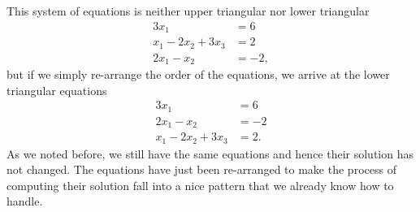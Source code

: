 This system of equations is neither upper triangular nor lower triangular
\begin{equation}
\label{eq:BeforeSwapping}
    \begin{aligned}
     3 x_1 &=6 \\
    x_1 - 2 x_2 + 3 x_3  &= 2 \\
         2 x_1 - x_2 &= -2,
    \end{aligned}
\end{equation}
but if we simply re-arrange the order of the equations, we arrive at the lower triangular equations
\begin{equation}
\label{eq:AfterSwapping}
    \begin{aligned}
     3 x_1 &=6 \\
         2 x_1 - x_2 &= -2 \\
             x_1 - 2 x_2 + 3 x_3  &= 2.
    \end{aligned}
\end{equation}
As we noted before, we still have the same equations and hence their solution has not changed. The equations have just been re-arranged to make the process of computing their solution fall into a nice pattern that we already know how to handle.\\

